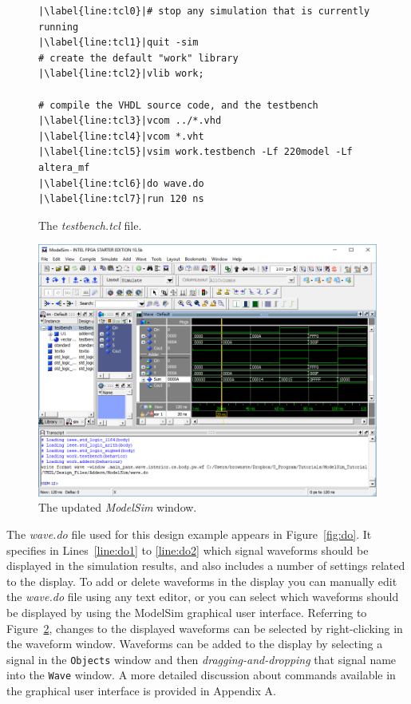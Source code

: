 \documentclass[11pt, twoside, pdftex]{article}
\begin{document}
\lstset{language=Tcl,numbers=left,escapechar=|}
\begin{figure}[h!]
\begin{center}
\begin{minipage}[t]{12.5 cm}
\begin{lstlisting}[name=tcl]
|\label{line:tcl0}|# stop any simulation that is currently running
|\label{line:tcl1}|quit -sim
# create the default "work" library
|\label{line:tcl2}|vlib work;

# compile the VHDL source code, and the testbench
|\label{line:tcl3}|vcom ../*.vhd
|\label{line:tcl4}|vcom *.vht
|\label{line:tcl5}|vsim work.testbench -Lf 220model -Lf altera_mf
|\label{line:tcl6}|do wave.do
|\label{line:tcl7}|run 120 ns
\end{lstlisting}
\end{minipage}
\caption{The {\it testbench.tcl} file.}
\label{fig:tcl}
\end{center}
\end{figure}
\begin{figure}[h!]
	\begin{center}
		\includegraphics[width = .85\textwidth]{figures/gui2.png}
	\end{center}
		  \caption{The updated {\it ModelSim} window.}
	\label{fig:gui2}
\end{figure}

The {\it wave.do} file used for this design example appears in Figure~\ref{fig:do}. 
It specifies in Lines~\ref{line:do1} to \ref{line:do2}
which signal waveforms should be displayed in the simulation results, and 
also includes a number of settings related to the display. To add or delete waveforms 
in the display you can manually edit the {\it wave.do} file using any text editor, 
or you can select which waveforms should be displayed by using the ModelSim graphical 
user interface. Referring to Figure~\ref{fig:gui2}, changes to the displayed waveforms 
can be selected by right-clicking in the waveform window. Waveforms can be added to 
the display by selecting a signal in the \texttt{Objects} window and then 
{\it dragging-and-dropping} that signal name into the \texttt{Wave} window. 
A more detailed discussion about commands
available in the graphical user interface is provided in Appendix A.
\end{document}
